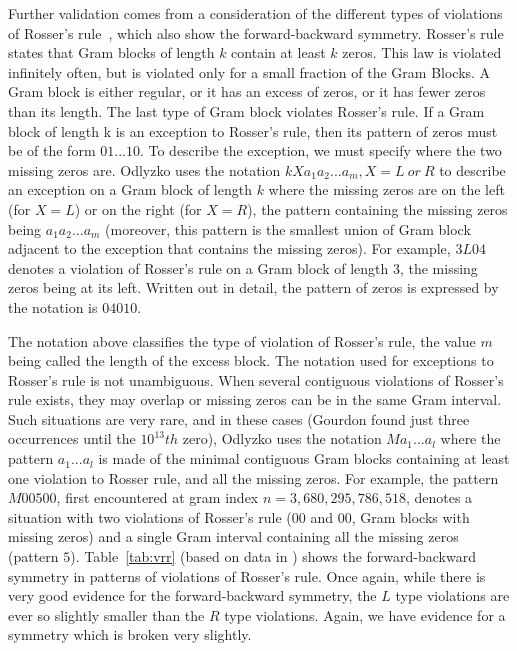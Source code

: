 \documentclass[twoside]{article}
\begin{document}
Further validation comes from a consideration of the different types of violations of Rosser's rule~\cite{gourdon}, which also show the forward-backward symmetry. Rosser's rule states that Gram blocks of length $k$ contain at least $k$ zeros. This law is violated infinitely often, but is violated only for a small fraction of the Gram Blocks. A Gram block is either regular, or it has an excess of zeros, or it has fewer zeros than its length. The last type of Gram block violates Rosser's rule. 
If a Gram block of length k is an exception to Rosser's rule, then its pattern of zeros must be of the form $01...10$. To describe the exception, we must specify where the two missing zeros are. Odlyzko uses the notation $kXa_1a_2 . . . a_m, X = L~or~R $ 
to describe an exception on a Gram block of length $k$  where the missing zeros are on the left (for $X = L$) or on the right (for $X = R$), the pattern containing the missing zeros being $a_1a_2 . . . a_m$ (moreover, this pattern is the smallest union of Gram block adjacent to the exception that contains the missing zeros). For example, $3L04$ denotes a violation of Rosser's rule on a Gram block of length 3, the missing zeros being at its left. Written out in detail, the pattern of zeros is expressed by the notation is $04010$.

The notation above classifies the type of violation of Rosser's rule, the value $m$ being called the length of the excess block. The notation used for exceptions to Rosser's rule is not unambiguous. When several contiguous violations of Rosser's rule exists, they may overlap or missing zeros can be in the same Gram interval. Such situations are very rare, and in these cases (Gourdon found just three occurrences until the $10^{13}th$ zero), Odlyzko uses the notation $Ma_1 ...a_l$ where the pattern $a_1 . . . a_l$ is made of the minimal contiguous Gram blocks containing at least one violation to Rosser rule, and all the missing zeros. For example, the pattern $M00500$, first encountered at gram index $n = 3,680,295,786,518$, denotes a situation with two violations of Rosser's rule ($00$ and $00$, Gram blocks with missing zeros) and a single Gram interval containing all the missing zeros (pattern $5$). 
Table~\ref{tab:vrr}  (based on data in \cite{gourdon}) shows the forward-backward symmetry in patterns of violations of Rosser's rule. Once again, while there is very good evidence for the forward-backward symmetry, the $L$ type violations are ever so slightly smaller than the $R$ type violations. Again, we have evidence for a symmetry which is broken very slightly.
\end{document}
